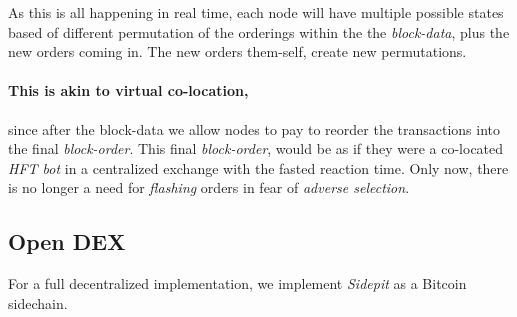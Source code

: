 \documentclass[12pt]{article}
\begin{document}
As this is all happening in real time, each node will have multiple possible states based of different permutation of the orderings within the the \emph{block-data}, plus the new orders coming in. The new orders them-self, create new permutations. 

\paragraph*{This is akin to virtual co-location,} since after the block-data we allow nodes to pay to reorder the transactions into the final \emph{block-order}. This final \emph{block-order}, would be as if they were a co-located \emph{HFT bot} in a centralized exchange with the fasted reaction time. Only now, there is no longer a need for \emph{flashing} orders in fear of \emph{adverse selection}. 

\subsection*{Open DEX}
For a full decentralized implementation, we implement \emph{Sidepit} as a Bitcoin sidechain.  
\end{document}
